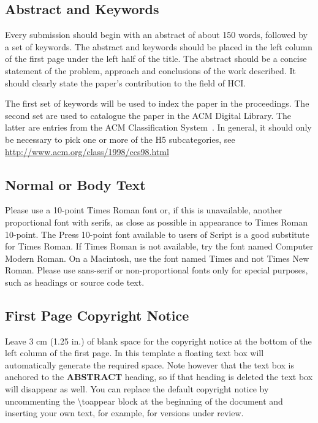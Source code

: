 \documentclass{sigchi}
\begin{document}
\subsection{Abstract and Keywords}

Every submission should begin with an abstract of about 150 words,
followed by a set of keywords. The abstract and keywords should be
placed in the left column of the first page under the left half of the
title. The abstract should be a concise statement of the problem,
approach and conclusions of the work described.  It should clearly
state the paper's contribution to the field of HCI.

The first set of keywords will be used to index the paper in the
proceedings. The second set are used to catalogue the paper in the ACM
Digital Library. The latter are entries from the ACM Classification
System~\cite{acm_categories}.  In general, it should only be necessary
to pick one or more of the H5 subcategories, see
\url{http://www.acm.org/class/1998/ccs98.html}

\subsection{Normal or Body Text}

Please use a 10-point Times Roman font or, if this is unavailable,
another proportional font with serifs, as close as possible in
appearance to Times Roman 10-point. The Press 10-point font available
to users of Script is a good substitute for Times Roman. If Times
Roman is not available, try the font named Computer Modern Roman. On a
Macintosh, use the font named Times and not Times New Roman. Please
use sans-serif or non-proportional fonts only for special purposes,
such as headings or source code text.

\subsection{First Page Copyright Notice}

Leave 3 cm (1.25 in.) of blank space for the copyright notice at the
bottom of the left column of the first page. In this template a
floating text box will automatically generate the required space. Note
however that the text box is anchored to the \textbf{ABSTRACT}
heading, so if that heading is deleted the text box will disappear as
well.  You can replace the default copyright notice by uncommenting
the {\textbackslash}toappear block at the beginning of the document
and inserting your own text, for example, for versions under review.
\end{document}

